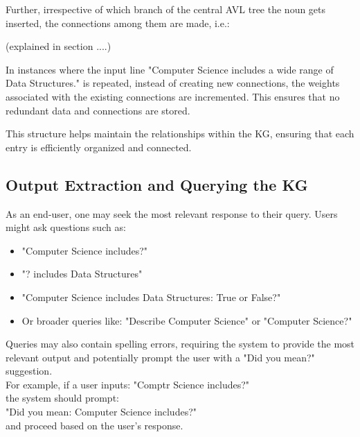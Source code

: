 \documentclass[conference]{IEEEtran}
\begin{document}
Further, irrespective of which branch of the central AVL tree the noun gets inserted, 
the connections among them are made, i.e.:


(explained in section ....)

In instances where the input line "Computer Science includes a wide range of Data Structures." is 
repeated, instead of creating new connections, the weights associated with the existing connections 
are incremented. This ensures that no redundant data and connections are stored.

This structure helps maintain the relationships within the KG, 
ensuring that each entry is efficiently organized and connected.


\subsection{Output Extraction and Querying the KG}

As an end-user, one may seek the most relevant response to their query. Users might ask questions such as:
\begin{itemize}
    \item "Computer Science includes?"
    \item "? includes Data Structures"
    \item "Computer Science includes Data Structures: True or False?"
    \item Or broader queries like: "Describe Computer Science" or "Computer Science?"
\end{itemize}

Queries may also contain spelling errors, requiring the system to provide the most relevant output and potentially prompt the user with a "Did you mean?" suggestion.
\\
For example, if a user inputs: "Comptr Science includes?" 
\\the system should prompt:
\\
"Did you mean: Computer Science includes?" 
\\
and proceed based on the user's response.
\\
\end{document}
